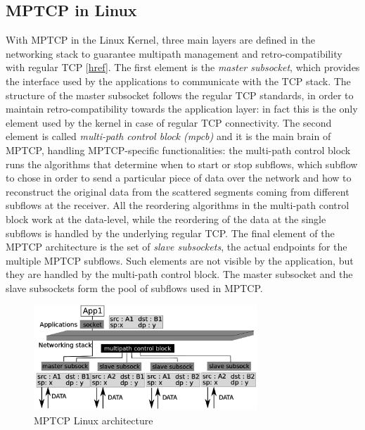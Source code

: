 \subsection{MPTCP in Linux}
With MPTCP in the Linux Kernel, three main layers are defined in the networking stack to guarantee multipath management and retro-compatibility with regular TCP [\href{http://inl.info.ucl.ac.be/publications/multipath-tcp-theory-practice}{href}]. The first element is the \textit{master subsocket}, which provides the interface used by the applications to communicate with the TCP stack. The structure of the master subsocket follows the regular TCP standards, in order to maintain retro-compatibility towards the application layer: in fact this is the only element used by the kernel in case of regular TCP connectivity. The second element is called \textit{multi-path control block (mpcb)} and it is the main brain of MPTCP, handling MPTCP-specific functionalities: the multi-path control block runs the algorithms that determine when to start or stop subflows, which subflow to chose in order to send a particular piece of data over the network and how to reconstruct the original data from the scattered segments coming from different subflows at the receiver. All the reordering algorithms in the multi-path control block work at the data-level, while the reordering of the data at the single subflows is handled by the underlying regular TCP. The final element of the MPTCP architecture is the set of \textit{slave subsockets}, the actual endpoints for the multiple MPTCP subflows. Such elements are not visible by the application, but they are handled by the multi-path control block. The master subsocket and the slave subsockets form the pool of subflows used in MPTCP.

\begin{figure}[!htb]
\centering
\includegraphics[width=0.75\textwidth]{images/architecture}
\caption{MPTCP Linux architecture}
\label{fig:architecture}
\end{figure}


